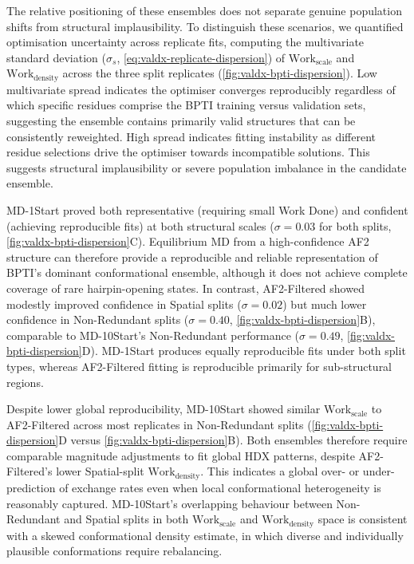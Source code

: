 The relative positioning of these ensembles does not separate genuine population shifts from structural implausibility. To distinguish these scenarios, we quantified optimisation uncertainty across replicate fits, computing the multivariate standard deviation ($\sigma_s$, \cref{eq:valdx-replicate-dispersion}) of $\text{Work}_\text{scale}$ and $\text{Work}_\text{density}$ across the three split replicates (\cref{fig:valdx-bpti-dispersion}). Low multivariate spread indicates the optimiser converges reproducibly regardless of which specific residues comprise the BPTI training versus validation sets, suggesting the ensemble contains primarily valid structures that can be consistently reweighted. High spread indicates fitting instability as different residue selections drive the optimiser towards incompatible solutions. This suggests structural implausibility or severe population imbalance in the candidate ensemble.

MD-1Start proved both representative (requiring small Work Done) and confident (achieving reproducible fits) at both structural scales ($\sigma=0.03$ for both splits, \cref{fig:valdx-bpti-dispersion}C). Equilibrium MD from a high-confidence AF2 structure can therefore provide a reproducible and reliable representation of BPTI's dominant conformational ensemble, although it does not achieve complete coverage of rare hairpin-opening states. In contrast, AF2-Filtered showed modestly improved confidence in Spatial splits ($\sigma=0.02$) but much lower confidence in Non-Redundant splits ($\sigma=0.40$, \cref{fig:valdx-bpti-dispersion}B), comparable to MD-10Start's Non-Redundant performance ($\sigma=0.49$, \cref{fig:valdx-bpti-dispersion}D). MD-1Start produces equally reproducible fits under both split types, whereas AF2-Filtered fitting is reproducible primarily for sub-structural regions.

Despite lower global reproducibility, MD-10Start showed similar $\text{Work}_\text{scale}$ to AF2-Filtered across most replicates in Non-Redundant splits (\cref{fig:valdx-bpti-dispersion}D versus \cref{fig:valdx-bpti-dispersion}B). Both ensembles therefore require comparable magnitude adjustments to fit global HDX patterns, despite AF2-Filtered's lower Spatial-split $\text{Work}_\text{density}$. This indicates a global over- or under-prediction of exchange rates even when local conformational heterogeneity is reasonably captured. MD-10Start's overlapping behaviour between Non-Redundant and Spatial splits in both $\text{Work}_\text{scale}$ and $\text{Work}_\text{density}$ space is consistent with a skewed conformational density estimate, in which diverse and individually plausible conformations require rebalancing.

